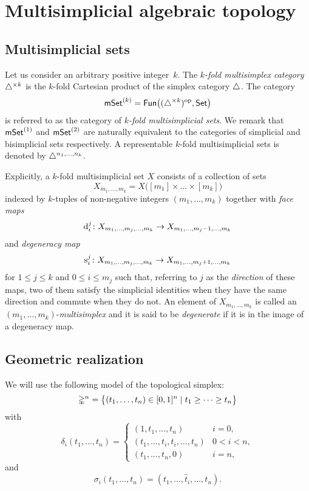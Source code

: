 
\section{Multisimplicial algebraic topology}\label{s:multisimplicial}

\subsection{Multisimplicial sets}\label{ss:multisimplicial sets}

Let us consider an arbitrary positive integer~$k$.
The \textit{$k$-fold multisimplex category} $\triangle^{\times k}$ is the $k$-fold Cartesian product of the simplex category $\triangle$.
The category
\[
\mathsf{mSet}^{(k)} = \mathsf{Fun}\big((\triangle^{\times k})^{\mathrm{op}}, \mathsf{Set}\big)
\]
is referred to as the category of \textit{$k$-fold multisimplicial sets}.
We remark that $\mathsf{mSet}^{(1)}$ and $\mathsf{mSet}^{(2)}$ are naturally equivalent to the categories of simplicial and bisimplicial sets respectively.
A representable $k$-fold multisimplicial sets is denoted by $\triangle^{n_1,\dots,n_k}$.

Explicitly, a $k$-fold multisimplicial set $X$ consists of a collection of sets
\[
X_{m_1,\dots,m_k} = X \big( [m_1] \times\dots\times [m_k] \big)
\]
indexed by $k$-tuples of non-negative integers $(m_1,\dots,m_k)$ together with \textit{face maps}
\[
\operatorname{d}_i^j \colon X_{m_1, \dots, m_j,\dots,m_k} \to X_{m_1, \dots, m_j-1, \dots, m_k}
\]
and \textit{degeneracy map}
\[
\operatorname{s}^j_i \colon X_{m_1, \dots, m_j,\dots,m_k} \to X_{m_1, \dots, m_j+1, \dots, m_k}
\]
for $1 \leq j \leq k$ and $0 \leq i \leq m_j$ such that, referring to $j$ as the \textit{direction} of these maps, two of them satisfy the simplicial identities when they have the same direction and commute when they do not.
An element of $X_{m_1,\dots,m_k}$ is called an $(m_1,\dots,m_k)$-\textit{multisimplex} and it is said to be \textit{degenerate} if it is in the image of a degeneracy map.

\subsection{Geometric realization}\label{ss:geometric realization}

We will use the following model of the topological simplex:
\[
\mathbb{\Delta}^n = \big\{
(t_1, \dots, t_n) \in [0,1]^n \mid t_1 \geq \dots \geq t_n
\big\}
\]
with
\[
\delta_i(t_1, \dots, t_n) =
\begin{cases}
	(1, t_1, \dots, t_n) & i = 0, \\
	(t_1, \dots, t_i, t_i, \dots, t_n) & 0 < i < n, \\
	(t_1, \dots, t_n, 0) & i = n,
\end{cases}
\]
and
\[
\sigma_i(t_1, \dots, t_n) = (t_1, \dots, \widehat t_i, \dots, t_n).
\]

